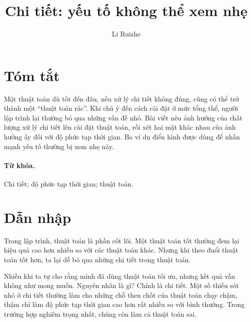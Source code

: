 \documentclass[11pt]{article}
\title{Chi tiết: yếu tố không thể xem nhẹ}
\author{Li Ruizhe}
\date{}
\begin{document}
\maketitle


\section*{Tóm tắt}

Một thuật toán dù tốt đến đâu, nếu xử lý chi tiết không đúng, cũng có thể trở
thành một ``thuật toán rác''. Khi chú ý đến cách cài đặt ở mức tổng thể, người
lập trình lại thường bỏ qua những vấn đề nhỏ. Bài viết nêu ảnh hưởng của chất
lượng xử lý chi tiết lên cài đặt thuật toán, rồi xét hai mặt khác nhau của
ảnh hưởng ấy đối với độ phức tạp thời gian. Ba ví dụ điển hình được dùng để
nhấn mạnh yếu tố thường bị xem nhẹ này.

\paragraph{Từ khóa.}
Chi tiết; độ phức tạp thời gian; thuật toán.

\tableofcontents

\section{Dẫn nhập}

Trong lập trình, thuật toán là phần cốt lõi. Một thuật toán tốt thường đem
lại hiệu quả cao hơn nhiều so với các thuật toán khác. Nhưng khi theo đuổi
thuật toán tốt hơn, ta lại dễ bỏ qua những chi tiết trong thuật toán.

Nhiều khi ta tự cho rằng mình đã dùng thuật toán tối ưu, nhưng kết quả vẫn
không như mong muốn. Nguyên nhân là gì? Chính là chi tiết. Một số thiếu sót
nhỏ ở chi tiết thường làm cho những chỗ then chốt của thuật toán chạy chậm,
thậm chí làm độ phức tạp thời gian cao hơn rất nhiều so với bình thường.
Trong trường hợp nghiêm trọng nhất, chúng còn làm cả thuật toán sai.
\end{document}
